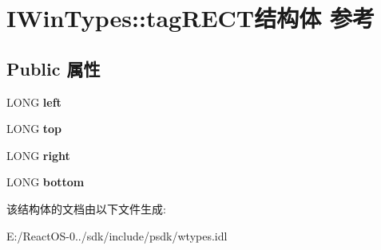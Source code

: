 \hypertarget{struct_i_win_types_1_1tag_r_e_c_t}{}\section{I\+Win\+Types\+:\+:tag\+R\+E\+C\+T结构体 参考}
\label{struct_i_win_types_1_1tag_r_e_c_t}
\subsection*{Public 属性}
\begin{DoxyCompactItemize}
\item 
\mbox{\label{struct_i_win_types_1_1tag_r_e_c_t_aeaba1e7eecb9d9f7111bf2ae718a9878}} 
L\+O\+NG {\bfseries left}
\item 
\mbox{\label{struct_i_win_types_1_1tag_r_e_c_t_af2399a89bba51ef8746edebd51035629}} 
L\+O\+NG {\bfseries top}
\item 
\mbox{\label{struct_i_win_types_1_1tag_r_e_c_t_a1046abca2119eebdae5dffdeb375af96}} 
L\+O\+NG {\bfseries right}
\item 
\mbox{\label{struct_i_win_types_1_1tag_r_e_c_t_a5371208fc56ed7c1ea950377c0255cd8}} 
L\+O\+NG {\bfseries bottom}
\end{DoxyCompactItemize}


该结构体的文档由以下文件生成\+:\begin{DoxyCompactItemize}
\item 
E\+:/\+React\+O\+S-\/0../sdk/include/psdk/wtypes.\+idl\end{DoxyCompactItemize}
